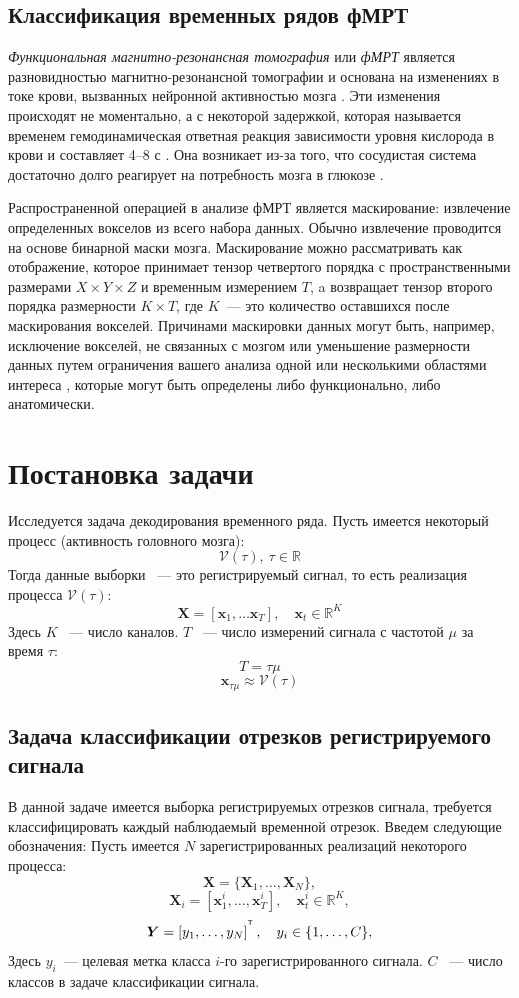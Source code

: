 \documentclass[a4paper, 12pt]{extarticle}
\begin{document}
\subsection*{Классификация временных рядов фМРТ}
\textit{Функциональная магнитно-резонансная томография} или \textit{фМРТ}
является разновидностью магнитно-резонансной томографии и основана на изменениях в токе крови,
вызванных нейронной активностью мозга \citep{Glover2011}.
Эти изменения происходят не моментально, а с некоторой задержкой,
которая называется временем гемодинамическая ответная реакция зависимости уровня кислорода в крови и составляет 4--8 с \citep{Bandettini1992}.
Она возникает из-за того, что сосудистая система достаточно долго реагирует на потребность мозга в глюкозе 
\citep{Logothetis2003}. 

Распространенной операцией в анализе фМРТ является маскирование: 
извлечение определенных вокселов из всего набора данных.
Обычно извлечение проводится на основе бинарной маски мозга. 
Маскирование можно рассматривать как отображение, 
которое принимает тензор четвертого порядка с пространственными размерами $X \times Y \times Z$ и временным измерением $T$, a 
возвращает тензор второго порядка размерности $K \times T$, где $K$~--- это количество оставшихся после маскирования вокселей.
Причинами маскировки данных могут быть, например, исключение вокселей, не связанных с мозгом 
или уменьшение размерности данных путем ограничения вашего анализа одной или несколькими областями интереса \citep{poldrack2007region}, 
которые могут быть определены либо функционально, либо анатомически.


\section{Постановка задачи}
Исследуется задача декодирования временного ряда. Пусть имеется некоторый процесс (активность головного мозга):
$$\mathcal{V}(\tau),~\tau \in \mathbb{R}$$
Тогда данные выборки ~--- это регистрируемый сигнал, то есть реализация процесса $\mathcal{V}(\tau)$:
$$\bm{X} = \left[\bm{x}_1,\dots \bm{x}_{T}\right], \quad \bm{x}_t \in \mathbb{R}^K$$
Здесь $K$ ~--- число каналов. $T$ ~--- число измерений сигнала с частотой $\mu$ за время $\tau$:
$$T = \tau \mu$$
$$\bm{x}_{\tau \mu} \approx \mathcal{V}(\tau)$$
\subsection{Задача классификации отрезков регистрируемого сигнала}
В данной задаче имеется выборка регистрируемых отрезков сигнала, 
требуется классифицировать каждый наблюдаемый временной отрезок. 
Введем следующие обозначения:
Пусть имеется $N$ зарегистрированных реализаций некоторого процесса:
$$\bm{X} = \{\bm{X}_1,\dots, \bm{X}_N\},$$
$$\bm{X}_i = \left[\bm{x}^i_1,\dots, \bm{x}^i_{T}\right], \quad \bm{x}^i_t \in \mathbb{R}^K,$$
$$\bm{Y} = \left[y_1, \dots, y_{N}\right]^{^{\mathsf{T}}}, \quad y_i \in \{1,\dots, C\},$$
Здесь $y_i$~--- целевая метка класса $i$-го зарегистрированного сигнала. $C$ ~--- число классов в задаче классификации сигнала. 
\end{document}
